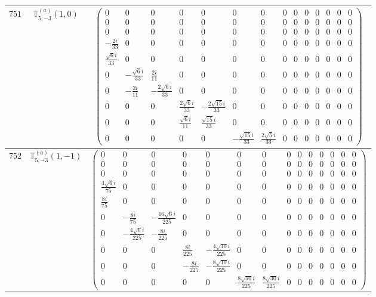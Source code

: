 \documentclass[fleqn,8pt,landscape]{jsarticle}
\begin{document}
\begin{center}
\begin{longtable}{ccc}
$ 751 $ & $ \mathbb{T}_{5,-3}^{(a)}(1,0) $ & $ \begin{pmatrix} 0 & 0 & 0 & 0 & 0 & 0 & 0 & 0 & 0 & 0 & 0 & 0 & 0 & 0 \\ 0 & 0 & 0 & 0 & 0 & 0 & 0 & 0 & 0 & 0 & 0 & 0 & 0 & 0 \\ 0 & 0 & 0 & 0 & 0 & 0 & 0 & 0 & 0 & 0 & 0 & 0 & 0 & 0 \\ - \frac{2 i}{33} & 0 & 0 & 0 & 0 & 0 & 0 & 0 & 0 & 0 & 0 & 0 & 0 & 0 \\ \frac{\sqrt{6} i}{33} & 0 & 0 & 0 & 0 & 0 & 0 & 0 & 0 & 0 & 0 & 0 & 0 & 0 \\ 0 & - \frac{\sqrt{6} i}{33} & \frac{2 i}{11} & 0 & 0 & 0 & 0 & 0 & 0 & 0 & 0 & 0 & 0 & 0 \\ 0 & - \frac{2 i}{11} & - \frac{2 \sqrt{6} i}{33} & 0 & 0 & 0 & 0 & 0 & 0 & 0 & 0 & 0 & 0 & 0 \\ 0 & 0 & 0 & \frac{2 \sqrt{6} i}{33} & - \frac{2 \sqrt{15} i}{33} & 0 & 0 & 0 & 0 & 0 & 0 & 0 & 0 & 0 \\ 0 & 0 & 0 & \frac{\sqrt{6} i}{11} & \frac{\sqrt{15} i}{33} & 0 & 0 & 0 & 0 & 0 & 0 & 0 & 0 & 0 \\ 0 & 0 & 0 & 0 & 0 & - \frac{\sqrt{15} i}{33} & \frac{2 \sqrt{5} i}{33} & 0 & 0 & 0 & 0 & 0 & 0 & 0 \end{pmatrix} $ \\ \hline
$ 752 $ & $ \mathbb{T}_{5,-3}^{(a)}(1,-1) $ & $ \begin{pmatrix} 0 & 0 & 0 & 0 & 0 & 0 & 0 & 0 & 0 & 0 & 0 & 0 & 0 & 0 \\ 0 & 0 & 0 & 0 & 0 & 0 & 0 & 0 & 0 & 0 & 0 & 0 & 0 & 0 \\ 0 & 0 & 0 & 0 & 0 & 0 & 0 & 0 & 0 & 0 & 0 & 0 & 0 & 0 \\ \frac{4 \sqrt{6} i}{75} & 0 & 0 & 0 & 0 & 0 & 0 & 0 & 0 & 0 & 0 & 0 & 0 & 0 \\ \frac{8 i}{75} & 0 & 0 & 0 & 0 & 0 & 0 & 0 & 0 & 0 & 0 & 0 & 0 & 0 \\ 0 & - \frac{8 i}{75} & - \frac{16 \sqrt{6} i}{225} & 0 & 0 & 0 & 0 & 0 & 0 & 0 & 0 & 0 & 0 & 0 \\ 0 & - \frac{4 \sqrt{6} i}{225} & - \frac{8 i}{225} & 0 & 0 & 0 & 0 & 0 & 0 & 0 & 0 & 0 & 0 & 0 \\ 0 & 0 & 0 & \frac{8 i}{225} & - \frac{4 \sqrt{10} i}{225} & 0 & 0 & 0 & 0 & 0 & 0 & 0 & 0 & 0 \\ 0 & 0 & 0 & - \frac{8 i}{225} & - \frac{8 \sqrt{10} i}{225} & 0 & 0 & 0 & 0 & 0 & 0 & 0 & 0 & 0 \\ 0 & 0 & 0 & 0 & 0 & \frac{8 \sqrt{10} i}{225} & \frac{8 \sqrt{30} i}{225} & 0 & 0 & 0 & 0 & 0 & 0 & 0 \end{pmatrix} $ \\ \hline

\end{longtable}
\end{center}
\end{document}
